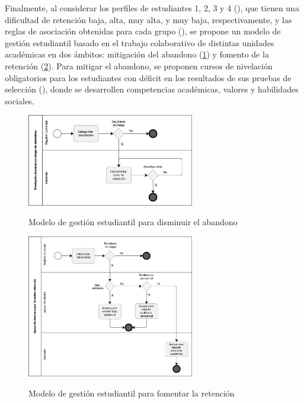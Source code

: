 \documentclass[portuguese]{textolivre}
\begin{document}
Finalmente, al considerar los perfiles de estudiantes 1, 2, 3 y 4 (), que tienen una dificultad de retención baja, alta, muy alta, y muy baja, respectivamente, y las reglas de asociación obtenidas para cada grupo (), se propone un modelo de gestión estudiantil basado en el trabajo colaborativo de distintas unidades académicas en dos ámbitos: mitigación del abandono (\cref{Figura 9}) y fomento de la retención (\cref{Figura 10}). Para mitigar el abandono, se proponen cursos de nivelación obligatorios para los estudiantes con déficit en los resultados de sus pruebas de selección (), donde se desarrollen competencias académicas, valores y habilidades sociales.

\begin{figure}[htbp]
 \centering
 \caption{Modelo de gestión estudiantil para disminuir el abandono}
 \includegraphics[width=0.65\textwidth]{images/fig-009.pdf}
 \label{Figura 9}
\end{figure}

\begin{figure}[htbp]
 \centering
 \caption{Modelo de gestión estudiantil para fomentar la retención}
 \includegraphics[width=0.65\textwidth]{images/fig-010}
 \label{Figura 10}
\end{figure}
\end{document}

